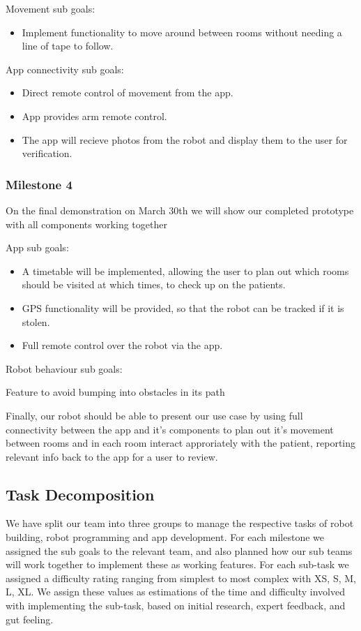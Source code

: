 \documentclass{article}
\begin{document}
Movement sub goals:
\begin{itemize}
\item Implement functionality to move around between rooms without needing a line of tape to follow.
\end{itemize}
App connectivity sub goals:
\begin{itemize}
\item Direct remote control of movement from the app.
\item App provides arm remote control.
\item The app will recieve photos from the robot and display them to the user for verification.
\end{itemize}

\subsubsection{Milestone 4}

On the final demonstration on March 30th we will show our completed prototype with all components working together

App sub goals:
\begin{itemize}
\item  A timetable will be implemented, allowing the user to plan out which rooms should be visited at which times, to check up on the patients.
\item GPS functionality will be provided, so that the robot can be tracked if it is stolen.
\item Full remote control over the robot via the app.
\end{itemize}

Robot behaviour sub goals:

Feature to avoid bumping into obstacles in its path

Finally, our robot should be able to present our use case by using full connectivity between the app and it's components to plan out it's movement between rooms and in each room interact approriately with the patient, reporting relevant info back to the app for a user to review.


\subsection{Task Decomposition}

We have split our team into three groups to manage the respective tasks of robot building, robot programming and app development. For each milestone we assigned the sub goals to the relevant team, and also planned how our sub teams will work together to implement these as working features.
For each sub-task we assigned a difficulty rating ranging from simplest to most complex with XS, S, M, L, XL. We assign these values as estimations of the time and difficulty involved with implementing the sub-task, based on initial research, expert feedback, and gut feeling. 
\end{document}
